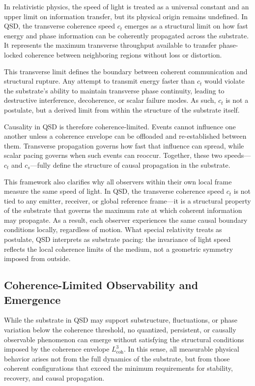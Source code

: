 \documentclass[entropy,article,submit,pdftex,oneauthor]{Definitions/mdpi}
\begin{document}
In relativistic physics, the speed of light is treated as a universal constant and an upper limit on information transfer, but its physical origin remains undefined. In QSD, the transverse coherence speed \texorpdfstring{\( c_t \)}{ct} emerges as a structural limit on how fast energy and phase information can be coherently propagated across the substrate. It represents the maximum transverse throughput available to transfer phase-locked coherence between neighboring regions without loss or distortion.

This transverse limit defines the boundary between coherent communication and structural rupture. Any attempt to transmit energy faster than \texorpdfstring{\( c_t \)}{ct} would violate the substrate's ability to maintain transverse phase continuity, leading to destructive interference, decoherence, or scalar failure modes. As such, \texorpdfstring{\( c_t \)}{ct} is not a postulate, but a derived limit from within the structure of the substrate itself.

Causality in QSD is therefore coherence-limited. Events cannot influence one another unless a coherence envelope can be offloaded and re-established between them. Transverse propagation governs how fast that influence can spread, while scalar pacing governs when such events can reoccur. Together, these two speeds—\texorpdfstring{\( c_t \)}{ct} and \texorpdfstring{\( c_s \)}{cs}—fully define the structure of causal propagation in the substrate.

This framework also clarifies why all observers within their own local frame measure the same speed of light. In QSD, the transverse coherence speed \( c_t \) is not tied to any emitter, receiver, or global reference frame—it is a structural property of the substrate that governs the maximum rate at which coherent information may propagate. As a result, each observer experiences the same causal boundary conditions locally, regardless of motion. What special relativity treats as postulate, QSD interprets as substrate pacing: the invariance of light speed reflects the local coherence limits of the medium, not a geometric symmetry imposed from outside.

\subsection{Coherence-Limited Observability and Emergence}

While the substrate in QSD may support substructure, fluctuations, or phase variation below the coherence threshold, no quantized, persistent, or causally observable phenomenon can emerge without satisfying the structural conditions imposed by the coherence envelope \texorpdfstring{\( L_{\text{coh}}^3 \)}{Lcoh\^{}3}. In this sense, all measurable physical behavior arises not from the full dynamics of the substrate, but from those coherent configurations that exceed the minimum requirements for stability, recovery, and causal propagation.
\end{document}
